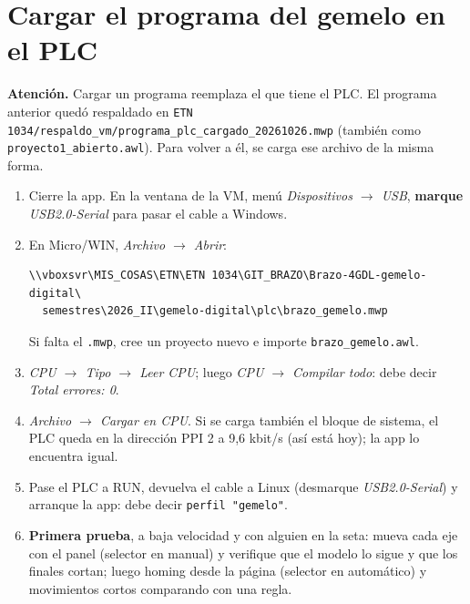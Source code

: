\documentclass[a4paper,11pt]{article}
\newcommand{\codigo}[1]{\texttt{#1}}
\newcommand{\aviso}[1]{\par\smallskip\noindent\colorbox{rojo!10}{\parbox{\dimexpr\linewidth-2\fboxsep}{\textbf{\color{rojo}Atención.} #1}}\par\smallskip}
\begin{document}


\section{Cargar el programa del gemelo en el PLC}
\aviso{Cargar un programa reemplaza el que tiene el PLC. El programa anterior quedó respaldado en \codigo{ETN 1034/respaldo\_vm/programa\_plc\_cargado\_20261026.mwp} (también como \codigo{proyecto1\_abierto.awl}). Para volver a él, se carga ese archivo de la misma forma.}
\begin{enumerate}
\item Cierre la app. En la ventana de la VM, menú \emph{Dispositivos $\rightarrow$ USB}, \textbf{marque} \emph{USB2.0-Serial} para pasar el cable a Windows.
\item En Micro/WIN, \emph{Archivo $\rightarrow$ Abrir}:
\begin{lstlisting}
\\vboxsvr\MIS_COSAS\ETN\ETN 1034\GIT_BRAZO\Brazo-4GDL-gemelo-digital\
  semestres\2026_II\gemelo-digital\plc\brazo_gemelo.mwp
\end{lstlisting}
Si falta el \codigo{.mwp}, cree un proyecto nuevo e importe \codigo{brazo\_gemelo.awl}.
\item \emph{CPU $\rightarrow$ Tipo $\rightarrow$ Leer CPU}; luego \emph{CPU $\rightarrow$ Compilar todo}: debe decir \emph{Total errores: 0}.
\item \emph{Archivo $\rightarrow$ Cargar en CPU}. Si se carga también el bloque de sistema, el PLC queda en la dirección PPI 2 a 9,6 kbit/s (así está hoy); la app lo encuentra igual.
\item Pase el PLC a RUN, devuelva el cable a Linux (desmarque \emph{USB2.0-Serial}) y arranque la app: debe decir \codigo{perfil "gemelo"}.
\item \textbf{Primera prueba}, a baja velocidad y con alguien en la seta: mueva cada eje con el panel (selector en manual) y verifique que el modelo lo sigue y que los finales cortan; luego homing desde la página (selector en automático) y movimientos cortos comparando con una regla.
\end{enumerate}

\end{document}
